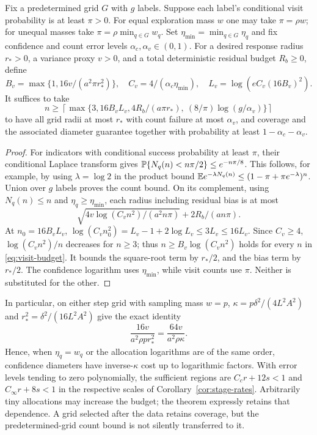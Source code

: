 \begin{proposition}
\label{prop:visits}
Fix a predetermined grid $G$ with $g$ labels. Suppose each label's conditional
visit probability is at least $\pi>0$. For equal exploration mass $w$ one may
take $\pi=\rho w$; for unequal masses take
$\pi=\rho\min_{q\in G}w_q$. Set
$\eta_{\min}=\min_{q\in G}\eta_q$ and fix confidence and count error levels
$\alpha_c,\alpha_v\in(0,1)$. For a desired response radius $r_*>0$, a variance
proxy $v>0$, and a total deterministic residual budget $R_b\ge0$, define
\begin{equation}
 B_v=\max\{1,16v/(a^2\pi r_*^2)\},\quad
 C_v=4/(\alpha_c\eta_{\min}),\quad L_v=\log(eC_v(16B_v)^2).
 \label{eq:visit-constants}
\end{equation}
It suffices to take
\begin{equation}
 n\ge\left\lceil\max\{3,16B_vL_v,
 4R_b/(a\pi r_*),\ (8/\pi)\log(g/\alpha_v)\}\right\rceil
 \label{eq:visit-budget}
\end{equation}
to have all grid radii at most $r_*$ with count failure at most $\alpha_v$,
and coverage and the associated diameter guarantee together with probability
at least $1-\alpha_c-\alpha_v$.
\end{proposition}
\begin{proof}
For indicators with conditional success probability at least $\pi$, their
conditional Laplace transform gives
$\mathbb P\{N_q(n)<n\pi/2\}\le e^{-n\pi/8}$. This follows, for example, by using
$\lambda=\log2$ in the product bound
$\mathbb E e^{-\lambda N_q(n)}\le(1-\pi+\pi e^{-\lambda})^n$.
Union over $g$ labels proves the count bound. On its complement, using
$N_q(n)\le n$ and $\eta_q\ge\eta_{\min}$, each radius including residual
bias is at most
\[
 \sqrt{4v\log(C_vn^2)/(a^2n\pi)}+2R_b/(an\pi).
\]
At $n_0=16B_vL_v$,
$\log(C_vn_0^2)=L_v-1+2\log L_v\le3L_v\le16L_v$.
Since $C_v\ge4$, $\log(C_vn^2)/n$ decreases for $n\ge3$; thus
$n\ge B_v\log(C_vn^2)$ holds for every $n$ in \eqref{eq:visit-budget}.
It bounds the square-root term by $r_*/2$, and the bias term by $r_*/2$.
The confidence logarithm uses $\eta_{\min}$, while visit counts use $\pi$.
Neither is substituted for the other.
\end{proof}

In particular, on either step grid with sampling mass $w=p$,
$\kappa=p\delta^2/(4L^2A^2)$ and $r_*^2=\delta^2/(16L^2A^2)$ give the exact
identity
\[
 \frac{16v}{a^2\rho p r_*^2}=\frac{64v}{a^2\rho\kappa}.
\]
Hence, when $\eta_q=w_q$ or the allocation logarithms are of the same order,
confidence diameters have inverse-$\kappa$ cost up to logarithmic factors.
With error levels tending to zero polynomially, the sufficient regions are
$C_c r+12s<1$ and $C_\infty r+8s<1$ in the respective scales of
Corollary~\ref{cor:stage-rates}. Arbitrarily tiny allocations may increase the
budget; the theorem expressly retains that dependence. A grid selected after
the data retains coverage, but the predetermined-grid count bound is not
silently transferred to it.
